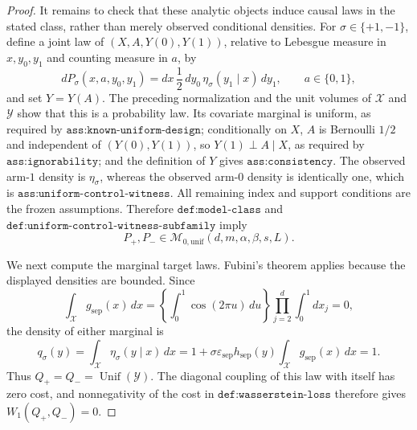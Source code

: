 \documentclass{article}
\begin{document}
\begin{proof}
It remains to check that these analytic objects induce causal laws in the stated class, rather than merely observed conditional densities.  For \(\sigma\in\{+1,-1\}\), define a joint law of \((X,A,Y(0),Y(1))\), relative to Lebesgue measure in \(x,y_0,y_1\) and counting measure in \(a\), by
\[
dP_\sigma(x,a,y_0,y_1)
=dx\,\frac12\,dy_0\,\eta_\sigma(y_1\mid x)\,dy_1,
\qquad a\in\{0,1\},
\]
and set \(Y=Y(A)\).  The preceding normalization and the unit volumes of \(\mathcal X\) and \(\mathcal Y\) show that this is a probability law.  Its covariate marginal is uniform, as required by \(\texttt{ass:known-uniform-design}\); conditionally on \(X\), \(A\) is Bernoulli \(1/2\) and independent of \((Y(0),Y(1))\), so \(Y(1)\perp A\mid X\), as required by \(\texttt{ass:ignorability}\); and the definition of \(Y\) gives \(\texttt{ass:consistency}\).  The observed arm-\(1\) density is \(\eta_\sigma\), whereas the observed arm-\(0\) density is identically one, which is \(\texttt{ass:uniform-control-witness}\).  All remaining index and support conditions are the frozen assumptions.  Therefore \(\texttt{def:model-class}\) and \(\texttt{def:uniform-control-witness-subfamily}\) imply
\[
P_+,P_-\in\mathcal M_{0,\mathrm{unif}}(d,m,\alpha,\beta,s,L).
\]

We next compute the marginal target laws.  Fubini's theorem applies because the displayed densities are bounded.  Since
\[
\int_{\mathcal X}g_{\mathrm{sep}}(x)\,dx
=\left\{\int_0^1\cos(2\pi u)\,du\right\}
 \prod_{j=2}^d\int_0^1dx_j=0,
\]
the density of either marginal is
\[
q_\sigma(y)=\int_{\mathcal X}\eta_\sigma(y\mid x)\,dx
=1+\sigma\varepsilon_{\mathrm{sep}}h_{\mathrm{sep}}(y)
 \int_{\mathcal X}g_{\mathrm{sep}}(x)\,dx=1.
\]
Thus \(Q_+=Q_-=\operatorname{Unif}(\mathcal Y)\).  The diagonal coupling of this law with itself has zero cost, and nonnegativity of the cost in \(\texttt{def:wasserstein-loss}\) therefore gives \(W_1(Q_+,Q_-)=0\).


\end{proof}
\end{document}
